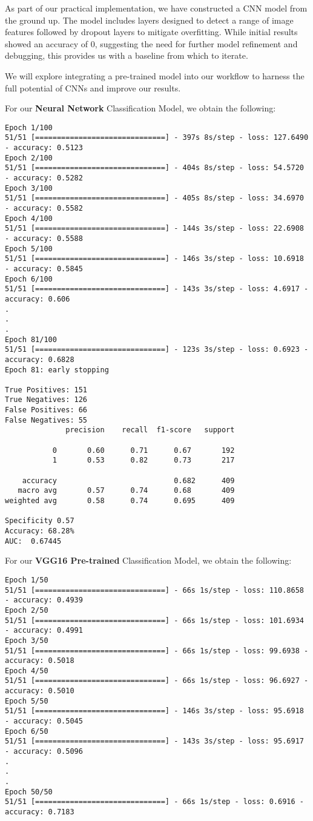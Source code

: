 \documentclass{article}
\begin{document}
\begin{titlepage}
\begin{itemize}
    As part of our practical implementation, we have constructed a CNN model from the ground up. The model includes layers designed to detect a range of image features followed by dropout layers to mitigate overfitting. While initial results showed an accuracy of 0, suggesting the need for further model refinement and debugging, this provides us with a baseline from which to iterate.

    We will explore integrating a pre-trained model into our workflow to harness the full potential of CNNs and improve our results.

For our \textbf{Neural Network} Classification Model, we obtain the following:

\begin{verbatim}
Epoch 1/100
51/51 [==============================] - 397s 8s/step - loss: 127.6490 - accuracy: 0.5123
Epoch 2/100
51/51 [==============================] - 404s 8s/step - loss: 54.5720 - accuracy: 0.5282
Epoch 3/100
51/51 [==============================] - 405s 8s/step - loss: 34.6970 - accuracy: 0.5582
Epoch 4/100
51/51 [==============================] - 144s 3s/step - loss: 22.6908 - accuracy: 0.5588
Epoch 5/100
51/51 [==============================] - 146s 3s/step - loss: 10.6918 - accuracy: 0.5845
Epoch 6/100
51/51 [==============================] - 143s 3s/step - loss: 4.6917 - accuracy: 0.606
.
.
.
Epoch 81/100
51/51 [==============================] - 123s 3s/step - loss: 0.6923 - accuracy: 0.6828
Epoch 81: early stopping

True Positives: 151
True Negatives: 126
False Positives: 66
False Negatives: 55
              precision    recall  f1-score   support

           0       0.60      0.71      0.67       192
           1       0.53      0.82      0.73       217

    accuracy                           0.682      409
   macro avg       0.57      0.74      0.68       409
weighted avg       0.58      0.74      0.695      409

Specificity 0.57
Accuracy: 68.28%
AUC:  0.67445
\end{verbatim}

For our \textbf{VGG16 Pre-trained} Classification Model, we obtain the following:

\begin{verbatim}
Epoch 1/50
51/51 [==============================] - 66s 1s/step - loss: 110.8658 - accuracy: 0.4939
Epoch 2/50
51/51 [==============================] - 66s 1s/step - loss: 101.6934 - accuracy: 0.4991
Epoch 3/50
51/51 [==============================] - 66s 1s/step - loss: 99.6938 - accuracy: 0.5018
Epoch 4/50
51/51 [==============================] - 66s 1s/step - loss: 96.6927 - accuracy: 0.5010
Epoch 5/50
51/51 [==============================] - 146s 3s/step - loss: 95.6918 - accuracy: 0.5045
Epoch 6/50
51/51 [==============================] - 143s 3s/step - loss: 95.6917 - accuracy: 0.5096
.
.
.
Epoch 50/50
51/51 [==============================] - 66s 1s/step - loss: 0.6916 - accuracy: 0.7183


\end{verbatim}
\end{itemize}
\end{titlepage}
\end{document}
